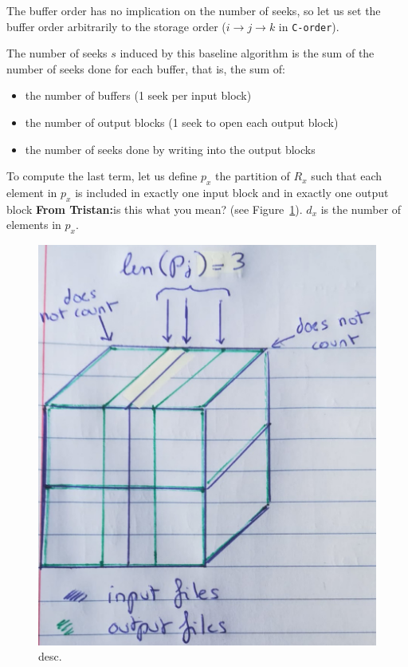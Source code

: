\documentclass[conference]{IEEEtran}
\newcommand{\tristan}[1]{\color{orange}\textbf{From Tristan:}#1\color{black}}
\begin{document}
The buffer order has no implication on the number of seeks, so let us set the buffer order arbitrarily
to the storage order ($i \rightarrow j \rightarrow k$ in \texttt{C-order}).

The number of seeks $s$ induced by this baseline algorithm is the
sum of the number of seeks done for each buffer, that is, the sum of:
\begin{itemize}
  \item the number of buffers (1 seek per input block)
  \item the number of output blocks (1 seek to open each output block)
  \item the number of seeks done by writing into the output blocks
\end{itemize}
To compute the last term, let us define $p_x$ the partition of $R_x$
such that each element in $p_x$ is included in exactly one input block and in exactly one output block \tristan{is this what you mean?}
(see Figure~\ref{fig:p}). $d_x$ is the number of elements in $p_x$.
\begin{figure}[h]
  \centering
  \includegraphics[scale=0.15]{./figures/new/p.jpeg}
  \caption{desc.}
  \label{fig:p}
  \end{figure}
\end{document}

